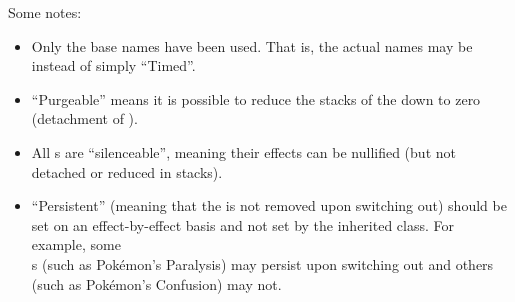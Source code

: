 
\vspace*{1em}

Some notes:

\begin{itemize}
	\item{Only the base names have been used. That is, the actual names may be\\  instead of simply ``Timed''.}
	\item{``Purgeable'' means it is possible to reduce the stacks of the  down to zero (detachment of ).}
	\item{All s are ``silenceable'', meaning their effects can be nullified (but not detached or reduced in stacks).}
	\item{``Persistent'' (meaning that the  is not removed upon switching out) should be set on an effect-by-effect basis and not set by the inherited class. For example, some\\s (such as Pok\'{e}mon's Paralysis) may persist upon switching out and others (such as Pok\'{e}mon's Confusion) may not.}
\end{itemize}


\postamble{}